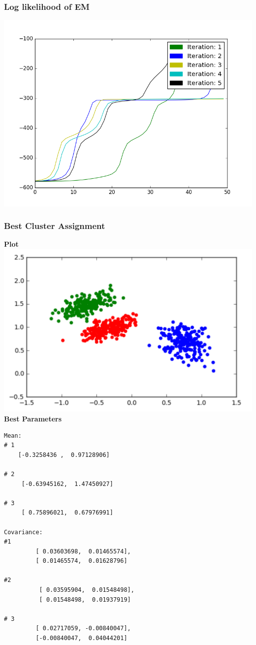 \documentclass[a4paper,doc,notimes]{article}
\begin{document}
\subsubsection{Log likelihood of EM}
\includegraphics[scale=0.55]{loglikelihood.png}
\subsubsection{Best Cluster Assignment}

\textbf{Plot} \\
 \includegraphics[scale=0.7]{em_clusters.png} \\

\textbf{Best Parameters}
\begin{verbatim}
Mean:
# 1
	[-0.3258436 ,  0.97128906]

# 2
	 [-0.63945162,  1.47450927]

# 3
	 [ 0.75896021,  0.67976991]

Covariance:
#1
		 [ 0.03603698,  0.01465574],
		 [ 0.01465574,  0.01628796]

#2
		  [ 0.03595904,  0.01548498],
		  [ 0.01548498,  0.01937919]

# 3
		 [ 0.02717059, -0.00840047],
		 [-0.00840047,  0.04044201]

\end{verbatim}
\end{document}
